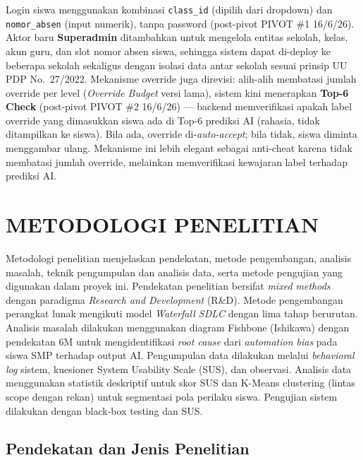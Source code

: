 \documentclass[12pt,a4paper,oneside,openany]{report}
\begin{document}
Login siswa menggunakan kombinasi \texttt{class\_id} (dipilih dari dropdown) dan \texttt{nomor\_absen} (input numerik), tanpa password (post-pivot PIVOT \#1 16/6/26). Aktor baru \textbf{Superadmin} ditambahkan untuk mengelola entitas sekolah, kelas, akun guru, dan slot nomor absen siswa, sehingga sistem dapat di-deploy ke beberapa sekolah sekaligus dengan isolasi data antar sekolah sesuai prinsip UU PDP No.~27/2022. Mekanisme override juga direvisi: alih-alih membatasi jumlah override per level (\textit{Override Budget} versi lama), sistem kini menerapkan \textbf{Top-6 Check} (post-pivot PIVOT \#2 16/6/26) --- backend memverifikasi apakah label override yang dimasukkan siswa ada di Top-6 prediksi AI (rahasia, tidak ditampilkan ke siswa). Bila ada, override di-\textit{auto-accept}; bila tidak, siswa diminta menggambar ulang. Mekanisme ini lebih elegant sebagai anti-cheat karena tidak membatasi jumlah override, melainkan memverifikasi kewajaran label terhadap prediksi AI.

\section{METODOLOGI PENELITIAN}
\label{sec:metodologi-penelitian}

Metodologi penelitian menjelaskan pendekatan, metode pengembangan, analisis masalah, teknik pengumpulan dan analisis data, serta metode pengujian yang digunakan dalam proyek ini. Pendekatan penelitian bersifat \textit{mixed methods} dengan paradigma \textit{Research and Development} (R\&D). Metode pengembangan perangkat lunak mengikuti model \textit{Waterfall SDLC} dengan lima tahap berurutan. Analisis masalah dilakukan menggunakan diagram Fishbone (Ishikawa) dengan pendekatan 6M untuk mengidentifikasi \textit{root cause} dari \textit{automation bias} pada siswa SMP terhadap output AI. Pengumpulan data dilakukan melalui \textit{behavioral log} sistem, kuesioner System Usability Scale (SUS), dan observasi. Analisis data menggunakan statistik deskriptif untuk skor SUS dan K-Means clustering (lintas scope dengan rekan) untuk segmentasi pola perilaku siswa. Pengujian sistem dilakukan dengan black-box testing dan SUS.

\subsection{Pendekatan dan Jenis Penelitian}
\label{subsec:pendekatan-penelitian}
\end{document}

